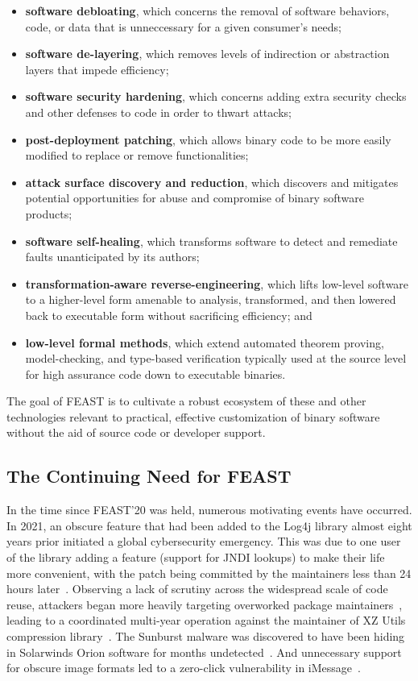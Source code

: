 \documentclass[sigconf]{acmart}
\begin{document}
\begin{itemize}[itemsep=.5ex plus1pt minus0pt]
  \item \textbf{software debloating}, which concerns the removal of software behaviors, code, or data that is unneccessary for a given consumer's needs;
  \item \textbf{software de-layering}, which removes levels of indirection or abstraction layers that impede efficiency;
  \item \textbf{software security hardening}, which concerns adding extra security checks and other defenses to code in order to thwart attacks;
  \item \textbf{post-deployment patching}, which allows binary code to be more easily modified to replace or remove functionalities;
  \item \textbf{attack surface discovery and reduction}, which discovers and mitigates potential opportunities for abuse and compromise of binary software products;
  \item \textbf{software self-healing}, which transforms software to detect and remediate faults unanticipated by its authors;
  \item \textbf{transformation-aware reverse-engineering}, which lifts low-level software to a higher-level form amenable to analysis, transformed, and then lowered back to executable form without sacrificing efficiency; and
  \item \textbf{low-level formal methods}, which extend automated theorem proving, model-checking, and type-based verification typically used at the source level for high assurance code down to executable binaries.
\end{itemize}

The goal of FEAST is to cultivate a robust ecosystem of these and other
technologies relevant to practical, effective customization of binary software
without the aid of source code or developer support.

\subsection{The Continuing Need for FEAST}
In the time since FEAST'20 was held, numerous motivating events have occurred.
In 2021, an obscure feature that had been added to the Log4j library
almost eight years prior initiated a global cybersecurity emergency.  This was
due to one user of the library adding a feature (support for JNDI lookups) to
make their life more convenient, with the patch being committed by the
maintainers less than 24 hours later~\cite{jndiflaw}.  Observing a lack of
scrutiny across the widespread scale of code reuse, attackers began more
heavily targeting overworked package maintainers~\cite{duan2021}, leading to a
coordinated multi-year operation against the maintainer of XZ Utils compression
library~\cite{xzutils}. The Sunburst malware was discovered to have been hiding
in Solarwinds Orion software for months undetected~\cite{sunburst}. And
unnecessary support for obscure image formats led to a zero-click vulnerability
in iMessage~\cite{forcedentry}.
\end{document}

